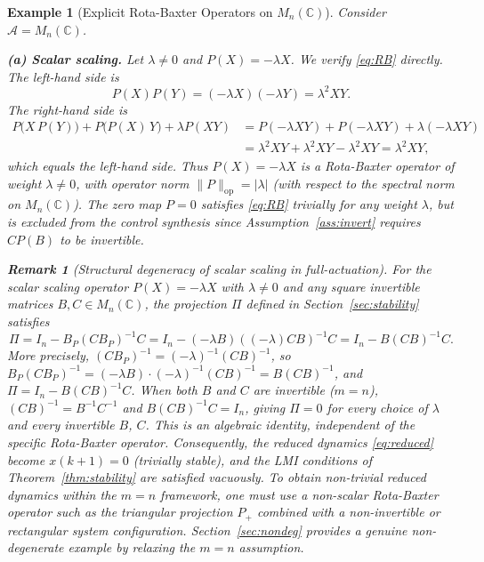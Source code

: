 \documentclass[10pt]{amsart}
\newcommand{\Ac}{\mathcal{A}}
\numberwithin{equation}{section}
\newtheorem{remark}[theorem]{Remark}
\newtheorem{example}[theorem]{Example}
\begin{document}
\begin{example}[Explicit Rota-Baxter Operators on \(M_n(\mathbb{C})\)]\label{ex:RB_Mn}
Consider \(\Ac = M_n(\mathbb{C})\).

\medskip
\noindent\textbf{(a) Scalar scaling.} Let \(\lambda \neq 0\) and \(P(X) = -\lambda X\).
We verify \eqref{eq:RB} directly. The left-hand side is
\[
P(X)P(Y) = (-\lambda X)(-\lambda Y) = \lambda^2 XY.
\]
The right-hand side is
\begin{align*}
P\bigl(X\,P(Y)\bigr) + P\bigl(P(X)\,Y\bigr) + \lambda P(XY)
  &= P(-\lambda XY) + P(-\lambda XY) + \lambda(-\lambda XY) \\
  &= \lambda^2 XY + \lambda^2 XY - \lambda^2 XY
   = \lambda^2 XY,
\end{align*}
which equals the left-hand side. Thus \(P(X)=-\lambda X\) is a Rota-Baxter operator of
weight \(\lambda\neq 0\), with operator norm \(\|P\|_{\mathrm{op}} = |\lambda|\) (with
respect to the spectral norm on $M_n(\mathbb{C})$). The zero map $P = 0$ satisfies
\eqref{eq:RB} trivially for any weight $\lambda$, but is excluded from the control
synthesis since Assumption~\ref{ass:invert} requires $CP(B)$ to be invertible.

\begin{remark}[Structural degeneracy of scalar scaling in full-actuation]
\label{rem:scalar_degen}
For the scalar scaling operator $P(X)=-\lambda X$ with $\lambda \neq 0$ and any square
invertible matrices $B, C \in M_n(\mathbb{C})$, the projection $\Pi$ defined in
Section~\ref{sec:stability} satisfies
\[
\Pi = I_n - B_P(CB_P)^{-1}C = I_n - (-\lambda B)((-\lambda)CB)^{-1}C
    = I_n - B(CB)^{-1}C.
\]
More precisely, $(CB_P)^{-1} = (-\lambda)^{-1}(CB)^{-1}$, so
$B_P(CB_P)^{-1} = (-\lambda B)\cdot(-\lambda)^{-1}(CB)^{-1} = B(CB)^{-1}$,
and $\Pi = I_n - B(CB)^{-1}C$. When both $B$ and $C$ are invertible ($m=n$),
$(CB)^{-1} = B^{-1}C^{-1}$ and $B(CB)^{-1}C = I_n$, giving $\Pi = 0$ for every
choice of $\lambda$ and every invertible $B$, $C$. This is an algebraic identity,
independent of the specific Rota-Baxter operator. Consequently, the reduced dynamics
\eqref{eq:reduced} become $x(k+1)=0$ (trivially stable), and the LMI conditions of
Theorem~\ref{thm:stability} are satisfied vacuously. To obtain non-trivial reduced
dynamics within the $m=n$ framework, one must use a non-scalar Rota-Baxter operator
such as the triangular projection $P_+$ combined with a non-invertible or rectangular
system configuration. Section~\ref{sec:nondeg} provides a genuine non-degenerate
example by relaxing the $m=n$ assumption.


\end{remark}
\end{example}
\end{document}
